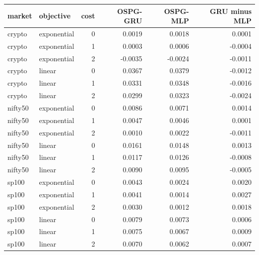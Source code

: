 \begin{tabular}{llrrrr}
\toprule
market & objective & cost & OSPG-GRU & OSPG-MLP & GRU minus MLP \\
\midrule
crypto & exponential & 0 & 0.0019 & 0.0018 & 0.0001 \\
crypto & exponential & 1 & 0.0003 & 0.0006 & -0.0004 \\
crypto & exponential & 2 & -0.0035 & -0.0024 & -0.0011 \\
crypto & linear & 0 & 0.0367 & 0.0379 & -0.0012 \\
crypto & linear & 1 & 0.0331 & 0.0348 & -0.0016 \\
crypto & linear & 2 & 0.0299 & 0.0323 & -0.0024 \\
nifty50 & exponential & 0 & 0.0086 & 0.0071 & 0.0014 \\
nifty50 & exponential & 1 & 0.0047 & 0.0046 & 0.0001 \\
nifty50 & exponential & 2 & 0.0010 & 0.0022 & -0.0011 \\
nifty50 & linear & 0 & 0.0161 & 0.0148 & 0.0013 \\
nifty50 & linear & 1 & 0.0117 & 0.0126 & -0.0008 \\
nifty50 & linear & 2 & 0.0090 & 0.0095 & -0.0005 \\
sp100 & exponential & 0 & 0.0043 & 0.0024 & 0.0020 \\
sp100 & exponential & 1 & 0.0041 & 0.0014 & 0.0027 \\
sp100 & exponential & 2 & 0.0030 & 0.0012 & 0.0018 \\
sp100 & linear & 0 & 0.0079 & 0.0073 & 0.0006 \\
sp100 & linear & 1 & 0.0075 & 0.0067 & 0.0009 \\
sp100 & linear & 2 & 0.0070 & 0.0062 & 0.0007 \\
\bottomrule
\end{tabular}
